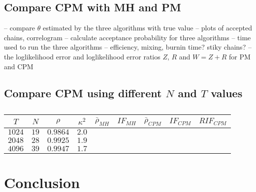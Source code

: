 \documentclass{article}
\begin{document}
\subsection{Compare CPM with MH and PM}


-- compare $\theta$ estimated by the three algorithms with true value
-- plots of accepted chains, correlogram
-- calculate acceptance probability for three algorithms
-- time used to run the three algorithms
-- efficiency, mixing, burnin time? stiky chains?
-- the loglikelihood error and loglikelihood error ratios $Z$, $R$ and $W=Z+R$ for PM and CPM



\subsection{Compare CPM using different $N$ and $T$ values}


\begin{table}[h]
\begin{center}
\begin{tabular}{ccccccccc}
\hline \hline
$T$    & $N$  & $\rho$   & $\kappa^2$ & $\bar{\rho}_{MH}$ & $IF_{MH}$ & $\bar{\rho}_{CPM}$ & $IF_{CPM}$ & $RIF_{CPM}$ \\ \hline
$1024$ & $19$ & $0.9864$ & $2.0$      &                   &           &                    &            &             \\ \hline
$2048$ & $28$ & $0.9925$ & $1.9$      &                   &           &                    &            &             \\ \hline
$4096$ & $39$ & $0.9947$ & $1.7$      &                   &           &                    &            &             \\ \hline \hline
\end{tabular}
\caption{} \label{}
\end{center}
\end{table}




  \section{Conclusion}
\end{document}
